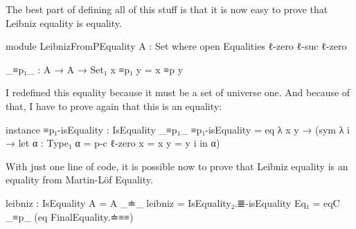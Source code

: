 \documentclass{article}
\begin{document}
The best part of defining all of this stuff is that it is now easy to prove that Leibniz equality is equality.

\begin{code}
module LeibnizFromPEquality {A : Set} where
  open Equalities {ℓ-zero} {ℓ-suc ℓ-zero}

  _≡p₁_ : A → A → Set₁
  x ≡p₁ y = x ≡p y
\end{code}

I redefined this equality because it must be a set of universe one.
And because of that, I have to prove again that this is an equality:

\begin{code}
  instance
    ≡p₁-isEquality : IsEquality _≡p₁_
    ≡p₁-isEquality = eq λ {x y} → (sym λ i → let
      α : Type₁
      α = p-c {ℓ-zero} {x = x} {y = y} i
      in α)
\end{code}

With just one line of code, it is possible now to prove that Leibniz equality is an equality
from Martin-Löf Equality.

\begin{code}
  leibniz : IsEquality {A = A} _≐_
  leibniz = IsEquality₂.≣-isEquality {Eq₁ = eqC _≡p_} (eq FinalEquality.≐≡≡)
\end{code}


\end{document}
